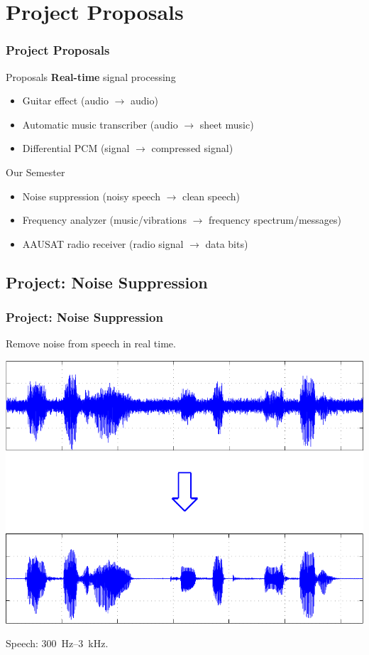\section{Project Proposals}

\begin{frame} \frametitle{Project Proposals}
    \begin{block}{Proposals}
        \textbf{Real-time} signal processing
        \begin{itemize}
        \item Guitar effect (audio $\rightarrow$ audio)
        \item Automatic music transcriber (audio $\rightarrow$ sheet music)
        \item Differential PCM (signal $\rightarrow$ compressed signal)
        \end{itemize}
    \end{block}
\pause
    \begin{block}{Our Semester}
        \begin{itemize}
        \item Noise suppression (noisy speech $\rightarrow$ clean speech)
        \item Frequency analyzer (music/vibrations $\rightarrow$ frequency spectrum/messages)
        \item AAUSAT radio receiver (radio signal $\rightarrow$ data bits)
        \end{itemize}
    \end{block}
\end{frame}

\subsection{Project: Noise Suppression}
\begin{frame}
    \frametitle{Project: Noise Suppression}
    Remove noise from speech in real time.
    \begin{center}
        \includegraphics[scale=0.5]{img/noise_1}
    \end{center}
    Speech: \SI{300}{Hz}--\SI{3}{kHz}.
\end{frame}

